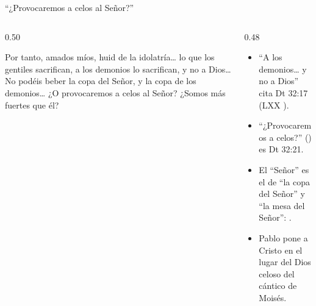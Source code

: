 \begin{frame}{``¿Provocaremos a celos al Señor?''}
\begin{columns}[t,onlytextwidth]
\begin{column}{0.50\textwidth}
\begin{cita}Por tanto, amados míos, huid de la idolatría\ldots{} lo que los gentiles sacrifican, a los demonios lo sacrifican, y no a Dios\ldots{} No podéis beber la copa del Señor, y la copa de los demonios\ldots{} ¿O provocaremos a celos al Señor? ¿Somos más fuertes que él?\end{cita}
\end{column}
\begin{column}{0.48\textwidth}\small
\begin{itemize}
\item ``A los demonios\ldots{} y no a Dios'' cita Dt 32:17 (LXX ).
\item ``¿Provocaremos a celos?'' () es Dt 32:21.
\item El ``Señor'' es el de ``la copa del Señor'' y ``la mesa del Señor'': .
\item Pablo pone a Cristo en el lugar del Dios celoso del cántico de Moisés.
\end{itemize}
\end{column}
\end{columns}
\end{frame}

